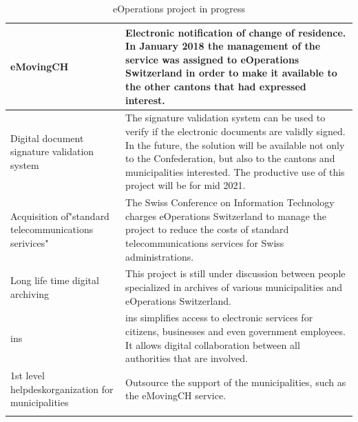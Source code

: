 \begin{longtable}[ c ]{| m{4cm} | m{9.5cm}|}
eMovingCH & Electronic notification of change of residence. In January 2018 the management of the service was assigned to eOperations Switzerland in order to make  it available to the other cantons that had expressed  interest.\\ \hline
Digital document \newline signature validation system & The signature validation system can be used to verify if the electronic documents are validly signed. In the future, the solution will be available not only to the Confederation, but also to the cantons and municipalities interested. The productive use of this project will be for mid 2021.\\ \hline
Acquisition of\newline "standard telecommunications serivices" & The Swiss Conference on Information Technology charges eOperations Switzerland to manage the project to reduce the costs of standard telecommunications services for Swiss administrations. \\ \hline
Long life time digital archiving & This project is still under discussion between people specialized in archives of various municipalities and eOperations Switzerland. \\ \hline
\acrlong{ins} & \acrshort{ins} simplifies access to electronic services for citizens, businesses and even government employees. It allows digital collaboration between all authorities that are involved.\\ \hline
1st level helpdesk\newline organization for \newline municipalities & Outsource the support of the municipalities, such as the eMovingCH service. \\ \hline
\caption{eOperations project in progress}
\label{eOpProgress}\\
\end{longtable}

